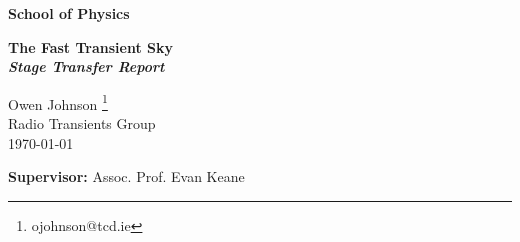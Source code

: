 \documentclass[a4paper,12pt]{article}
\numberwithin{equation}{section}
\newcounter{daggerfootnote}
\newcommand*{\daggerfootnote}[1]{%
    \setcounter{daggerfootnote}{\value{footnote}}%
    \renewcommand*{\thefootnote}{\fnsymbol{footnote}}%
    \footnote[2]{#1}%
    \setcounter{footnote}{\value{daggerfootnote}}%
    \renewcommand*{\thefootnote}{\arabic{footnote}}%
    }
\begin{document}
\begin{minipage}[b]{110mm}
        {\LARGE\bf School of Physics %
        \vspace*{17mm}}
\end{minipage}
\hfill
\begin{minipage}[t]{40mm}               
\end{minipage}
\par\noindent                                           %
\vspace*{2cm}
\begin{center}
        \Large\bf The Fast Transient Sky\\
        \normalsize \textit{Stage Transfer Report}
\end{center}
\vspace*{1.5cm}
\begin{center}
        Owen Johnson\daggerfootnote{ojohnson@tcd.ie}\\ 
        Radio Transients Group\\ 
        \monthyeardate\today            %
\end{center}
\vspace*{5mm}
%
%                       

\vspace*{1cm}


\vfill
{\bf Supervisor:} Assoc. Prof. Evan Keane    
\thispagestyle{empty} 
\end{document}
